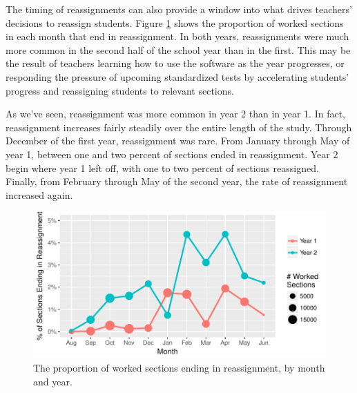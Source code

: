 \documentclass[notitlepage,12pt]{jedm}\usepackage[]{graphicx}\usepackage[]{color}
\makeatletter
\def\maxwidth{ %
  \ifdim\Gin@nat@width>\linewidth
    \linewidth
  \else
    \Gin@nat@width
  \fi
}
\makeatother
\begin{document}
The timing of reassignments can also provide a window into what drives
teachers' decisions to reassign students.
Figure \ref{fig:byMonth} shows the proportion of worked sections in
each month that end in reassignment.
In both years, reassignments were much more common in the second half
of the school year than in the first.
This may be the result of teachers learning how to use the software as
the year progresses, or responding the pressure of upcoming
standardized tests by accelerating students' progress and reassigning
students to relevant sections.

As we've seen, reassignment was more common in year 2 than in year 1.
In fact, reassignment increases fairly steadily over the entire length
of the study.
Through December of the first year, reassignment was rare. From
January through May of year 1, between one and two percent of sections
ended in reassignment.
Year 2 begin where year 1 left off, with one to two percent of
sections reassigned.
Finally, from February through May of the second year, the rate of
reassignment increased again.



\begin{figure}
  \centering

\includegraphics[width=\maxwidth]{figure/byMonth-1} 

\caption{The proportion of worked sections ending in reassignment, by
  month and year.}
\label{fig:byMonth}
\end{figure}
\end{document}
